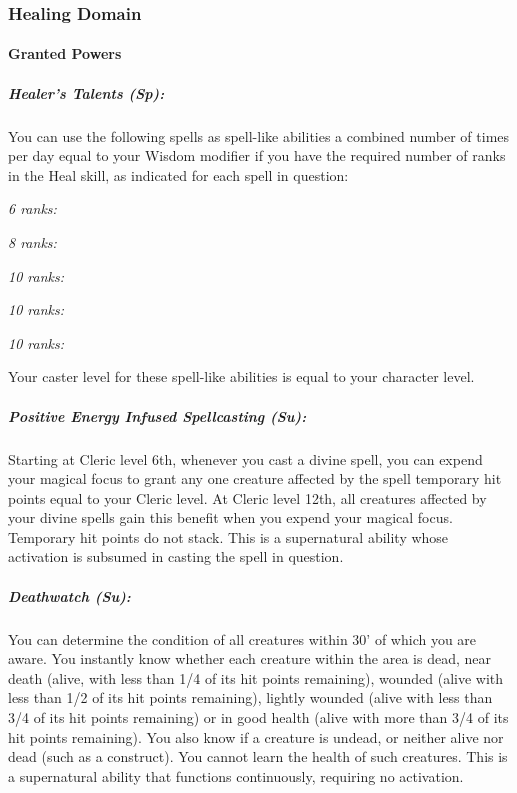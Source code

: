 \subsubsection{Healing Domain}
\paragraph{Granted Powers}
\subparagraph{Healer's Talents (Sp):}
You can use the following spells as spell-like abilities a combined number of times per day equal to your Wisdom modifier if you have the required number of ranks in the Heal skill, as indicated for each spell in question:
\begin{list}{}{\leftmargin=1em}
 \item \emph{6 ranks:} 
 \item \emph{8 ranks:} 
 \item \emph{10 ranks:} 
 \item \emph{10 ranks:} 
 \item \emph{10 ranks:} 
\end{list}
Your caster level for these spell-like abilities is equal to your character level.
\subparagraph{Positive Energy Infused Spellcasting (Su):}
Starting at Cleric level 6th, whenever you cast a divine spell, you can expend your magical focus to grant any one creature affected by the spell temporary hit points equal to your Cleric level. 
At Cleric level 12th, all creatures affected by your divine spells gain this benefit when you expend your magical focus.
Temporary hit points do not stack.
This is a supernatural ability whose activation is subsumed in casting the spell in question.
\subparagraph{Deathwatch (Su):}
You can determine the condition of all creatures within 30' of which you are aware. You instantly know whether each creature within the area is dead, near death (alive, with less than 1/4 of its hit points remaining), wounded (alive with less than 1/2 of its hit points remaining), lightly wounded (alive with less than 3/4 of its hit points remaining) or in good health (alive with more than 3/4 of its hit points remaining).
You also know if a creature is undead, or neither alive nor dead (such as a construct). You cannot learn the health of such creatures.
This is a supernatural ability that functions continuously, requiring no activation.
